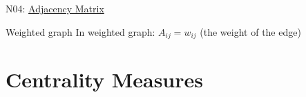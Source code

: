 \documentclass[aspectratio=169, 10pt]{beamer}
\begin{document}
\begin{frame}{N04: \href{https://en.wikipedia.org/wiki/Adjacency_matrix}{Adjacency Matrix}}
    \vspace{3mm}
    
    \begin{block}{Weighted graph}
        In weighted graph: $A_{ij} = w_{ij}$ (the weight of the edge)
    \end{block}
    
\end{frame}

\section{Centrality Measures}

\end{document}
